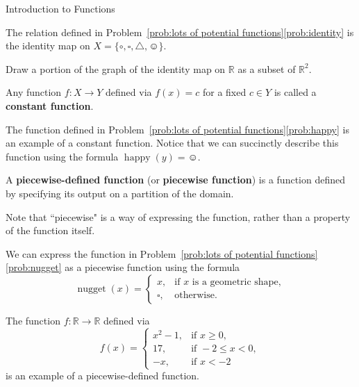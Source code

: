 \begin{section}{Introduction to Functions}
\begin{example}
The relation defined in Problem~\ref{prob:lots of potential functions}\ref{prob:identity} is the identity map on $X=\{\circ, \square,\triangle,\smiley\}$.
\end{example}

\begin{problem}
Draw a portion of the graph of the identity map on $\mathbb{R}$ as a subset of $\mathbb{R}^2$.
\end{problem}

\begin{definition}
Any function $f:X\to Y$ defined via $f(x)=c$ for a fixed $c\in Y$ is called a \textbf{constant function}.
\end{definition}

\begin{example}
The function defined in Problem~\ref{prob:lots of potential functions}\ref{prob:happy} is an example of a constant function.  Notice that we can succinctly describe this function using the formula $\operatorname{happy}(y)=\smiley$.
\end{example}

\begin{definition}
A \textbf{piecewise-defined function} (or \textbf{piecewise function}) is a function defined by specifying its output on a partition of the domain.
\end{definition}

Note that ``piecewise" is a way of expressing the function, rather than a property of the function itself.

\begin{example}
We can express the function in Problem~\ref{prob:lots of potential functions}\ref{prob:nugget} as a piecewise function using the formula
\[
\operatorname{nugget}(x)=\begin{cases}
x, & \mbox{if } x\mbox{ is a geometric shape},\\
\square, & \mbox{otherwise}.
\end{cases}
\]
\end{example}

\begin{example}
The function $f:\mathbb{R}\to \mathbb{R}$ defined via
\[
f(x)=\begin{cases}
x^2-1, & \mbox{if } x\geq 0,\\
17, & \mbox{if } -2\leq x< 0,\\
-x, & \mbox{if } x<-2
\end{cases}
\]
is an example of a piecewise-defined function.
\end{example}


\end{section}
